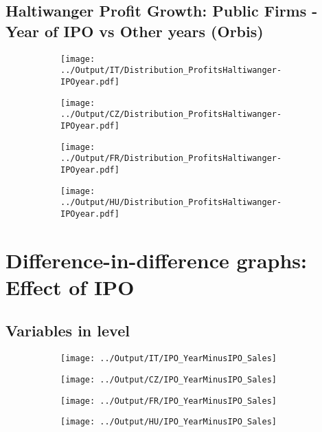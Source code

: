 \documentclass[12pt,notitlepage]{article}
\begin{document}
\subsection{Haltiwanger Profit Growth: Public Firms - Year of IPO vs Other years (Orbis)}
\begin{figure}[!htpb]
\centering
\begin{subfigure}{.49\textwidth}
    \centering
 \texttt{[image: ../Output/IT/Distribution\_ProfitsHaltiwanger-IPOyear.pdf]}
\end{subfigure}%
\begin{subfigure}{.49\textwidth}
    \centering
 \texttt{[image: ../Output/CZ/Distribution\_ProfitsHaltiwanger-IPOyear.pdf]}
\end{subfigure}
\begin{subfigure}{.49\textwidth}
    \centering
 \texttt{[image: ../Output/FR/Distribution\_ProfitsHaltiwanger-IPOyear.pdf]}
\end{subfigure}%
\begin{subfigure}{.49\textwidth}
    \centering
 \texttt{[image: ../Output/HU/Distribution\_ProfitsHaltiwanger-IPOyear.pdf]}
\end{subfigure}
\end{figure}
\pagebreak



\section{Difference-in-difference graphs: Effect of IPO}

\subsection{Variables in level}
\begin{figure}[!htpb]
\centering
\caption{IPO and Sales}
\begin{subfigure}{.49\textwidth}
    \centering
 \texttt{[image: ../Output/IT/IPO\_YearMinusIPO\_Sales]}
\end{subfigure}%
\begin{subfigure}{.49\textwidth}
    \centering
 \texttt{[image: ../Output/CZ/IPO\_YearMinusIPO\_Sales]}
\end{subfigure}
\begin{subfigure}{.49\textwidth}
    \centering
 \texttt{[image: ../Output/FR/IPO\_YearMinusIPO\_Sales]}
\end{subfigure}%
\begin{subfigure}{.49\textwidth}
    \centering
 \texttt{[image: ../Output/HU/IPO\_YearMinusIPO\_Sales]}
\end{subfigure}
\end{figure}
\pagebreak
\end{document}
